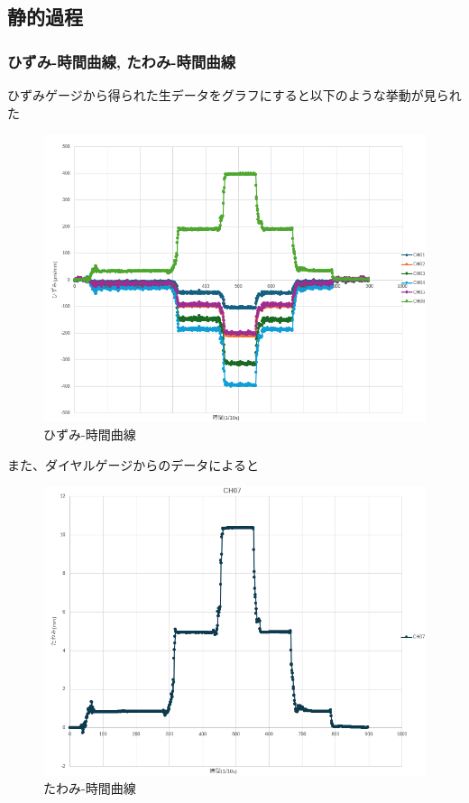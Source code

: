 \documentclass[a4j]{jarticle}
\begin{document}
\subsection{静的過程}
\subsubsection{ひずみ-時間曲線, たわみ-時間曲線}
ひずみゲージから得られた生データをグラフにすると以下のような挙動が見られた
\begin{figure}[H]
    \centering
    \includegraphics[width=0.8\linewidth]{summer/ship-experiment/bend/picture/hizumi-time.png}
    \caption{ひずみ-時間曲線}
    \label{fig:hizumi-time}
\end{figure}

また、ダイヤルゲージからのデータによると
\begin{figure}[H]
    \centering
    \includegraphics[width=0.8\linewidth]{summer/ship-experiment/bend/picture/tawami-time.png}
    \caption{たわみ-時間曲線}
    \label{fig:tawami-time}
\end{figure}
\end{document}
